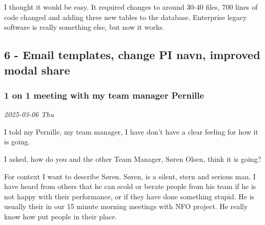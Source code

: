 \documentclass[../main.tex]{subfiles}
\begin{document}
I thought it would be easy. It required changes to around 30-40 files, 700 lines of code changed and adding three new tables to the database. Enterprise legacy software is really something else, but now it works. 

\subsection{6 - Email templates, change PI navn, improved modal share }

\subsubsection{1 on 1 meeting with my team manager Pernille}

\noindent \textit{2025-03-06 Thu}




I told my Pernille, my team manager, I have don't have a clear feeling for how it is going.

I asked, how do you and the other Team Manager, Søren Olsen, think it is going?

For context I want to describe Søren. Søren, is a silent, stern and serious man. I have heard from others that he can scold or berate people from his team if he is not happy with their performance, or if they have done something stupid. He is usually their in our 15 minute morning meetings with NFO project. He really know how put people in their place.
\end{document}
